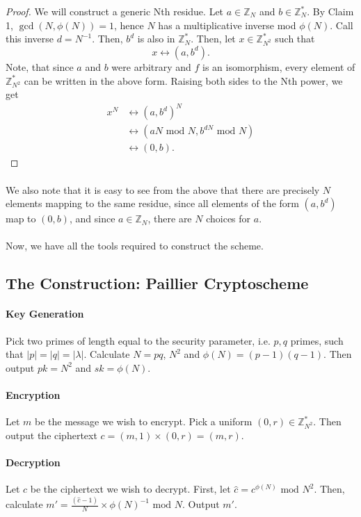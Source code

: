 \documentclass{article}
\theoremstyle{definition}
\newcommand{\Int}{\mathbb{Z}}
\renewcommand{\mod}{\,\,\text{mod}\,\,}
\begin{document}
\begin{proof}
  We will construct a generic Nth residue. Let $a \in \Int_N$ and $b \in
  \Int_N^*$. By Claim 1, $\gcd(N, \phi(N)) = 1$, hence $N$ has a multiplicative
  inverse mod $\phi(N)$. Call this inverse $d = N^{-1}$. Then, $b^d$ is also in $\Int_N^*$. Then, let $x \in \Int_{N^2}^*$ such
  that
  \[
    x \leftrightarrow (a, b^d).
  \] 
  Note, that since $a$ and $b$ were arbitrary and $f$ is an isomorphism, every
  element of $\Int_{N^2}^*$ can be written in the above form. Raising both sides
  to the Nth power, we get
  \begin{align*}
    x^N &\leftrightarrow (a, b^d)^N \\
        &\leftrightarrow (aN \mod N, b^{dN} \mod N) \\
        &\leftrightarrow (0, b).
  \end{align*}
\end{proof}
\paragraph{} We also note that it is easy to see from the above that there are
precisely $N$ elements mapping to the same residue, since all elements of the
form $(a, b^d)$ map to $(0, b)$, and since $a\in \Int_N$, there are $N$ choices
for $a$.
\paragraph{} Now, we have all the tools required to construct the scheme.
\subsection{The Construction: Paillier Cryptoscheme}
\paragraph{Key Generation}
Pick two primes of length equal to the security parameter, i.e. $p, q$ primes,
such that $|p| = |q| = |\lambda|$. Calculate $N = pq$, $N^2$ and $\phi(N) = (p -
1)(q - 1)$.
Then output $pk = N^2$ and $sk = \phi(N)$.
\paragraph{Encryption}
Let $m$ be the message we wish to encrypt. Pick a uniform $(0, r) \in
\Int_{N^2}^*$. Then output the ciphertext $c = (m, 1) \times (0, r) = (m, r)$.
\paragraph{Decryption} 
Let $c$ be the ciphertext we wish to decrypt. First, let $\hat{c} = c^{\phi(N)}
\mod N^2$. Then, calculate $m' = \frac{(\hat{c} - 1)}{N} \times \phi(N)^{-1} \mod N$.
Output $m'$.
\end{document}
